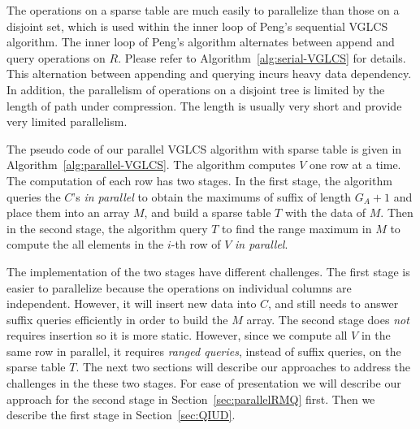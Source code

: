 
The operations on a sparse table are much easily to parallelize than
those on a disjoint set, which is used within the inner loop of Peng's
sequential VGLCS algorithm.  The inner loop of Peng's algorithm
alternates between append and query operations on $R$.  Please refer
to Algorithm~\ref{alg:serial-VGLCS} for details.  This alternation
between appending and querying incurs heavy data dependency.  In
addition, the parallelism of operations on a disjoint tree is limited
by the length of path under compression.  The length is usually very
short and provide very limited parallelism.

The pseudo code of our parallel VGLCS algorithm with sparse table is
given in Algorithm~\ref{alg:parallel-VGLCS}.  The algorithm computes
$V$ one row at a time.  The computation of each row has two stages.
In the first stage, the algorithm queries the $C$'s {\em in parallel}
to obtain the maximums of suffix of length $G_A + 1$ and place them
into an array $M$, and build a sparse table $T$ with the data of $M$.
Then in the second stage, the algorithm query $T$ to find the range
maximum in $M$ to compute the all elements in the $i$-th row of $V$
{\em in parallel}.



The implementation of the two stages have different challenges.  The
first stage is easier to parallelize because the operations on
individual columns are independent.  However, it will insert new data
into $C$, and still needs to answer suffix queries efficiently in
order to build the $M$ array.  The second stage does {\em not}
requires insertion so it is more static.  However, since we compute
all $V$ in the same row in parallel, it requires {\em ranged queries},
instead of suffix queries, on the sparse table $T$.  The next two
sections will describe our approaches to address the challenges in the
these two stages.  For ease of presentation we will describe our
approach for the second stage in Section~\ref{sec:parallelRMQ} first.
Then we describe the first stage in Section~\ref{sec:QIUD}.
